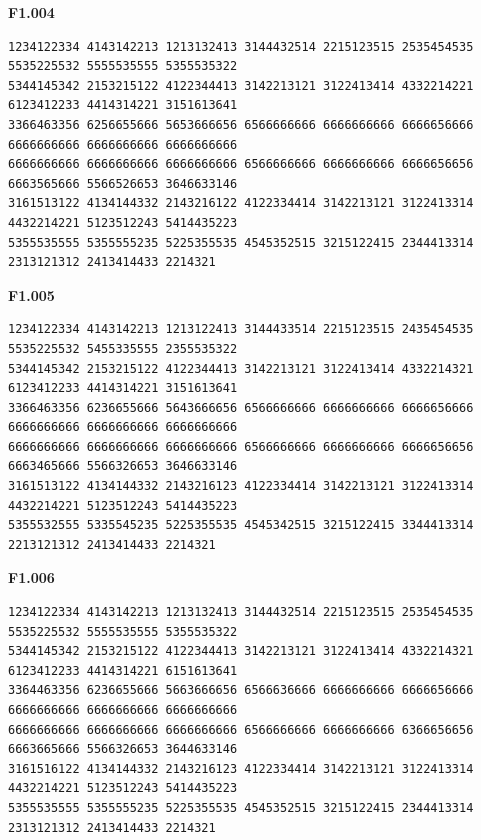 \noindent\begin{minipage}{\linewidth}\textbf{F1.004}
\begin{lstlisting}
1234122334 4143142213 1213132413 3144432514 2215123515 2535454535 5535225532 5555535555 5355535322
5344145342 2153215122 4122344413 3142213121 3122413414 4332214221 6123412233 4414314221 3151613641
3366463356 6256655666 5653666656 6566666666 6666666666 6666656666 6666666666 6666666666 6666666666
6666666666 6666666666 6666666666 6566666666 6666666666 6666656656 6663565666 5566526653 3646633146
3161513122 4134144332 2143216122 4122334414 3142213121 3122413314 4432214221 5123512243 5414435223
5355535555 5355555235 5225355535 4545352515 3215122415 2344413314 2313121312 2413414433 2214321
\end{lstlisting}
\end{minipage}\par\smallskip

\noindent\begin{minipage}{\linewidth}\textbf{F1.005}
\begin{lstlisting}
1234122334 4143142213 1213122413 3144433514 2215123515 2435454535 5535225532 5455335555 2355535322
5344145342 2153215122 4122344413 3142213121 3122413414 4332214321 6123412233 4414314221 3151613641
3366463356 6236655666 5643666656 6566666666 6666666666 6666656666 6666666666 6666666666 6666666666
6666666666 6666666666 6666666666 6566666666 6666666666 6666656656 6663465666 5566326653 3646633146
3161513122 4134144332 2143216123 4122334414 3142213121 3122413314 4432214221 5123512243 5414435223
5355532555 5335545235 5225355535 4545342515 3215122415 3344413314 2213121312 2413414433 2214321
\end{lstlisting}
\end{minipage}\par\smallskip

\noindent\begin{minipage}{\linewidth}\textbf{F1.006}
\begin{lstlisting}
1234122334 4143142213 1213132413 3144432514 2215123515 2535454535 5535225532 5555535555 5355535322
5344145342 2153215122 4122344413 3142213121 3122413414 4332214321 6123412233 4414314221 6151613641
3364463356 6236655666 5663666656 6566636666 6666666666 6666656666 6666666666 6666666666 6666666666
6666666666 6666666666 6666666666 6566666666 6666666666 6366656656 6663665666 5566326653 3644633146
3161516122 4134144332 2143216123 4122334414 3142213121 3122413314 4432214221 5123512243 5414435223
5355535555 5355555235 5225355535 4545352515 3215122415 2344413314 2313121312 2413414433 2214321
\end{lstlisting}
\end{minipage}\par\smallskip

